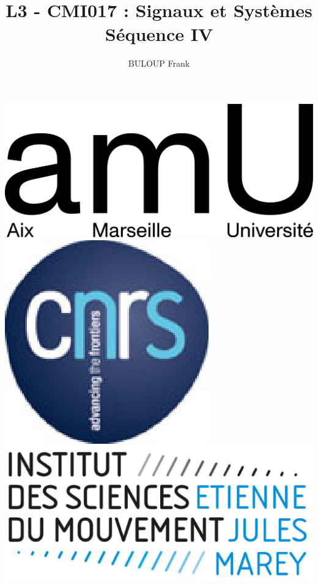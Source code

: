 \documentclass[a4paper,11pt]{beamer}
\title{L3 - CMI017 : Signaux et Systèmes\\Séquence IV}
\author{BULOUP Frank}
\institute{Aix Marseille Université\\Institut des Sciences du Mouvement}
\date{}
\begin{document}
\begin{frame}[plain]  
	\titlepage  
	\vspace{1cm}
	
	\includegraphics[scale=0.6]{images/LogoAMU.png}\hspace*{2cm}
	\includegraphics[scale=0.2]{images/LogoCNRS.eps}\hspace*{2cm}
	\includegraphics[scale=0.1]{images/LogoISM.eps}
\end{frame} 
  
\end{document}
